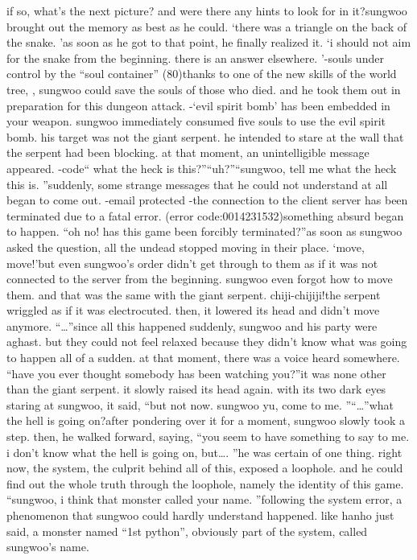 if so, what’s the next picture? and were there any hints to look for in it?sungwoo brought out the memory as best as he could.
‘there was a triangle on the back of the snake.
’as soon as he got to that point, he finally realized it.
‘i should not aim for the snake from the beginning.
 there is an answer elsewhere.
’-souls under control by the “soul container” (80)thanks to one of the new skills of the world tree, , sungwoo could save the souls of those who died.
 and he took them out in preparation for this dungeon attack.
-‘evil spirit bomb’ has been embedded in your weapon.
sungwoo immediately consumed five souls to use the evil spirit bomb.
 his target was not the giant serpent.
 he intended to stare at the wall that the serpent had been blocking.
at that moment, an unintelligible message appeared.
-code“ what the heck is this?”“uh?”“sungwoo, tell me what the heck this is.
”suddenly, some strange messages that he could not understand at all began to come out.
-email protected 
-the connection to the client server has been terminated due to a fatal error.
 (error code:0014231532)something absurd began to happen.
“oh no! has this game been forcibly terminated?”as soon as sungwoo asked the question, all the undead stopped moving in their place.
‘move, move!’but even sungwoo’s order didn’t get through to them as if it was not connected to the server from the beginning.
 sungwoo even forgot how to move them.
and that was the same with the giant serpent.
chiji-chijiji!the serpent wriggled as if it was electrocuted.
 then, it lowered its head and didn’t move anymore.
“…”since all this happened suddenly, sungwoo and his party were aghast.
but they could not feel relaxed because they didn’t know what was going to happen all of a sudden.
at that moment, there was a voice heard somewhere.
“have you ever thought somebody has been watching you?”it was none other than the giant serpent.
 it slowly raised its head again.
with its two dark eyes staring at sungwoo, it said, “but not now.
 sungwoo yu, come to me.
”“…”what the hell is going on?after pondering over it for a moment, sungwoo slowly took a step.
then, he walked forward, saying, “you seem to have something to say to me.
 i don’t know what the hell is going on, but….
”he was certain of one thing.
 right now, the system, the culprit behind all of this, exposed a loophole.
 and he could find out the whole truth through the loophole, namely the identity of this game.
“sungwoo, i think that monster called your name.
”following the system error, a phenomenon that sungwoo could hardly understand happened.
 like hanho just said, a monster named “1st python”, obviously part of the system, called sungwoo’s name.

